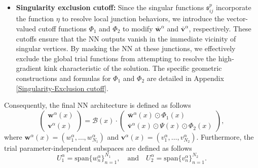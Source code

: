 \documentclass[oneside]{article}
\begin{document}
\begin{itemize}
    \item \textbf{Singularity exclusion cutoff:} Since the singular functions $\mathfrak{s}_{ij}^p$ incorporate the function $\eta$ to resolve local junction behaviors, we introduce the vector-valued cutoff functions $\Phi_1$ and $\Phi_2$ to modify $\bar{\mathbf{w}}^\alpha$ and $\bar{\mathbf{v}}^\alpha$, respectively. These cutoffs ensure that the NN outputs vanish in the immediate vicinity of singular vertices. By masking the NN at these junctions, we effectively exclude the global trial functions from attempting to resolve the high-gradient kink characteristic of the solution. The specific geometric constructions and formulas for $\Phi_1$ and $\Phi_2$ are detailed in Appendix \ref{Singularity-Exclusion cutoff}.
\end{itemize}
Consequently, the final NN architecture is defined as follows
\begin{equation} \label{eq2_walpha-valpha}
\left(
\begin{array}{c}
\mathbf{w}^\alpha(x) \\
\mathbf{v}^\alpha(x) 
\end{array}
\right) = \mathcal{B}(x) \cdot 
\left(
\begin{array}{c}
\bar{\mathbf{w}}^\alpha(x) \odot \Phi_1(x) \\ \bar{\mathbf{v}}^\alpha(x) \odot \Psi(x) \odot \Phi_2(x) \end{array}\right), \end{equation}
where $\mathbf{w}^\alpha(x) = (w^\alpha_1, \dots, w^\alpha_{N_1})$ and $\mathbf{v}^\alpha(x) = (v^\alpha_1, \dots, v^\alpha_{N_2})$. Furthermore, the trial parameter-independent subspaces are defined as follows
\begin{equation}
U_1^\alpha = \text{span} \{ w^\alpha_n \}_{n=1}^{N_1}, \quad \text{and} \quad U_2^\alpha = \text{span} \{ v^\alpha_n \}_{n=1}^{N_2}.
\end{equation}
\end{document}
